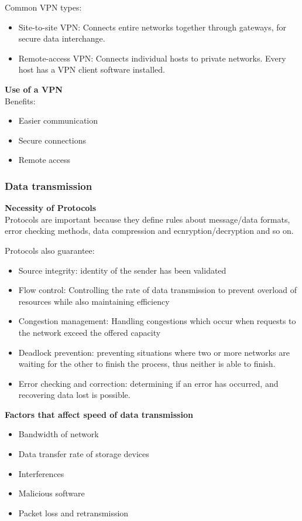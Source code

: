 \documentclass{article}
\begin{document}
Common VPN types:
\begin{itemize}
    \item Site-to-site VPN: Connects entire networks together through gateways,
        for secure data interchange.
    \item Remote-access VPN: Connects individual hosts to private networks.
        Every host has a VPN client software installed.
\end{itemize}

\textbf{Use of a VPN} \\
Benefits:
\begin{itemize}
    \item Easier communication
    \item Secure connections
    \item Remote access
\end{itemize}

\subsubsection{Data transmission}

\textbf{Necessity of Protocols} \\
Protocols are important because they define rules about message/data formats,
error checking methods, data compression and ecnryption/decryption and so on.

Protocols also guarantee:
\begin{itemize}
    \item Source integrity: identity of the sender has been validated
    \item Flow control: Controlling the rate of data transmission to prevent
        overload of resources while also maintaining efficiency
    \item Congestion management: Handling congestions which occur when requests
        to the network exceed the offered capacity
    \item Deadlock prevention: preventing situations where two or more networks
        are waiting for the other to finish the process, thus neither is able
        to finish.
    \item Error checking and correction: determining if an error has occurred,
        and recovering data lost is possible.
\end{itemize}

\textbf{Factors that affect speed of data transmission}
\begin{itemize}
    \item Bandwidth of network
    \item Data transfer rate of storage devices
    \item Interferences
    \item Malicious software
    \item Packet loss and retransmission
\end{itemize}
\end{document}
